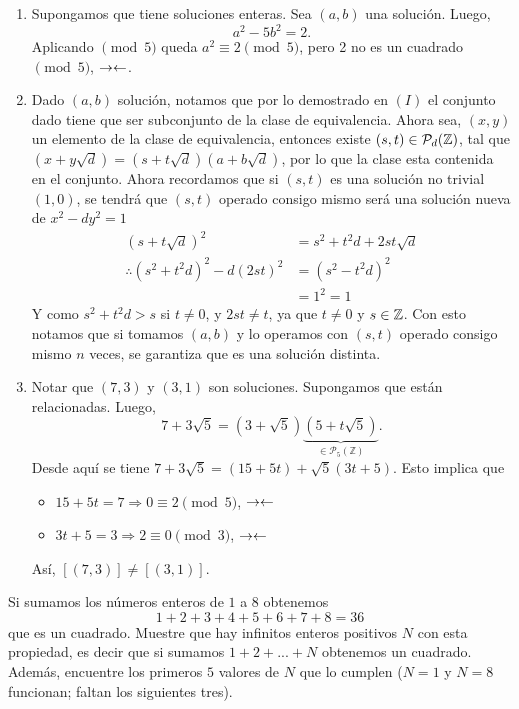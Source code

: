 \begin{sol}
\begin{enumerate}[label = (\roman*)]
		\item Supongamos que tiene soluciones enteras. Sea $(a, b)$ una solución. Luego,
		      \[a^2 - 5b^2 = 2.\]
		      Aplicando $\pmod{5}$ queda $a^2 \equiv 2 \pmod{5}$, pero 2 no es un cuadrado $\pmod{5}$, $\rightarrow\leftarrow$.
		\item Dado $(a,b)$ solución, notamos que por lo demostrado en $(I)$ el conjunto dado tiene que ser subconjunto de la clase de equivalencia. Ahora sea, $(x,y)$ un elemento de la clase de equivalencia, entonces existe $(s,t)\in\mathcal{P}_d(\mathbb{Z})$, tal que $(x+y\sqrt{d})=(s+t\sqrt{d})(a+b\sqrt{d})$, por lo que la clase esta contenida en el conjunto. Ahora recordamos que si $(s,t)$ es una solución no trivial $(1,0)$, se tendrá que $(s,t)$ operado consigo mismo será una solución nueva de $x^2-dy^2=1$
		      \begin{align*}
			      (s+t\sqrt{d})^2                 & = s^2+t^2d+2st\sqrt{d} \\
			      \therefore(s^2+t^2d)^2-d(2st)^2 & = (s^2-t^2d)^2         \\
			                                      & = 1^2 = 1
		      \end{align*}
		      Y como $s^2+t^2d > s$ si $t\neq0$, y $2st\neq t$, ya que $t\neq 0$ y $s\in\mathbb{Z}$. Con esto notamos que si tomamos $(a,b)$ y lo operamos con $(s,t)$ operado consigo mismo $n$ veces, se garantiza que es una solución distinta.

		\item Notar que $(7, 3)$ y $(3, 1)$ son soluciones. Supongamos que están relacionadas. Luego,
		      \[7 + 3\sqrt{5} = (3 + \sqrt{5})\underbrace{(5 + t\sqrt{5})}_{\in \mathcal{P}_5 (\mathbb{Z})}.\]
		      Desde aquí se tiene $7 + 3\sqrt{5} = (15 + 5t) + \sqrt{5}(3t + 5)$.
		      Esto implica que \begin{itemize}
			      \item $15 + 5t = 7 \Rightarrow 0 \equiv 2 \pmod 5$, $\rightarrow\leftarrow$
			      \item $3t + 5 = 3 \Rightarrow 2 \equiv 0 \pmod 3$, $\rightarrow\leftarrow$
		      \end{itemize}
		      Así, $[(7, 3)] \not= [(3, 1)]$.
	\end{enumerate}
\end{sol}

\begin{prob}[3 pts.]
	Si sumamos los números enteros de $1$ a $8$ obtenemos
	\[1+2+3+4+5+6+7+8=36\]
	que es un cuadrado. Muestre que hay infinitos enteros positivos $N$ con esta propiedad, es decir que si sumamos $1+2+...+N$ obtenemos un cuadrado. Además, encuentre los primeros $5$ valores de $N$ que lo cumplen ($N=1$ y $N=8$ funcionan; faltan los siguientes tres).
\end{prob}

